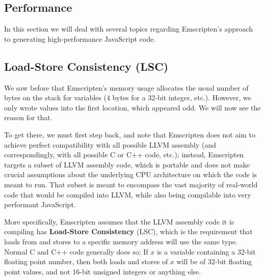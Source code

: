 \documentclass[11pt]{proc}
\begin{document}
\subsection{Performance}

In this section we will deal with several topics regarding
Emscripten's approach to generating high-performance JavaScript code.

\subsection{Load-Store Consistency (LSC)}
\label{sec:lsc}

We saw before that Emscripten's memory usage allocates the usual number
of bytes on the stack for variables (4 bytes for a 32-bit integer, etc.).
However, we only wrote values into the first location, which appeared odd.
We will now see the reason for that.

To get there, we must first step back, and note that
Emscripten does not aim to achieve perfect compatibility with all possible
LLVM assembly (and correspondingly, with all possible C or C++ code, etc.);
instead, Emscripten targets a subset of LLVM assembly code, which is portable
and does not make crucial assumptions about the underlying CPU architecture
on which the code is meant to run. That subset is meant to encompass the
vast majority of real-world code that would be compiled into LLVM,
while also being compilable into very
performant JavaScript.

More specifically, Emscripten assumes that the LLVM assembly code it is
compiling has \textbf{Load-Store Consistency} (LSC), which is the requirement that
loads from and stores to a specific memory address will use the same type. Normal C and C++
code generally does so: If $x$ is a variable containing a 32-bit floating
point number, then both loads and stores of $x$ will be of 32-bit floating
point values, and not 16-bit unsigned integers or anything else.
\end{document}
